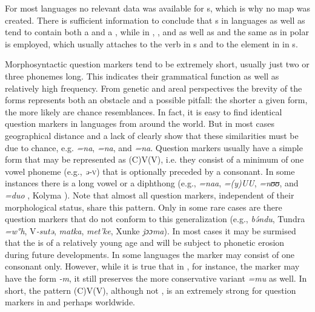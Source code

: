 For most languages no relevant data was available for s, which is why no map was created. There is sufficient information to conclude that s in  languages as well as  tend to contain both a  and a , while in , , and  as well as  and  the same  as in polar  is employed, which usually attaches to the verb in s and to the element in  in s.

Morphosyntactic question markers tend to be extremely short, usually just two or three phonemes long. This indicates their grammatical function as well as relatively high frequency. From genetic and areal perspectives the brevity of the forms represents both an obstacle and a possible pitfall: the shorter a given form, the more likely are chance resemblances. In fact, it is easy to find identical question markers in languages from around the world. But in most cases geographical distance and a lack of  clearly show that these similarities must be due to chance, e.g.  \textit{=na},  \textit{=na}, and  \textit{=na}. Question markers usually have a simple form that may be represented as (C)V(V), i.e. they consist of a minimum of one vowel phoneme (e.g.,  \textit{ə{}-}\textsc{v}) that is optionally preceded by a consonant. In some instances there is a long vowel or a diphthong (e.g.,  \textit{=naa},  \textit{=(y)UU},  \textit{=nʊʊ},  and  \textit{=duo} , Kolyma  ). Note that almost all question markers, independent of their morphological status, share this pattern. Only in some rare cases are there question markers that do not conform to this generalization (e.g.,  \textit{bə́}\textit{ndu}, Tundra  \textit{=w°h},  V\textit{{}-sutə},  \textit{matka},  \textit{met’ke}, Xunke  \textit{jɔɔma}). In most cases it may be surmised that the  is of a relatively young age and will be subject to phonetic erosion during future developments. In some languages the marker may consist of one consonant only. However, while it is true that in , for instance, the marker may have the form \textit{{}-m}, it still preserves the more conservative variant \textit{=mu} as well. In short, the pattern (C)V(V), although not , is an extremely strong  for question markers in  and perhaps worldwide.

